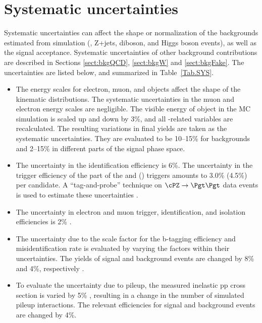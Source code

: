 \section{Systematic uncertainties}
\label{sect:sys}
Systematic uncertainties can affect the shape or normalization of the
backgrounds estimated from simulation (\ttbar, Z+jets, diboson, and Higgs boson events),
as well as the signal acceptance.
Systematic uncertainties of other background contributions are described in Sections \ref{sect:bkgQCD}, \ref{sect:bkgW} and \ref{sect:bkgFake}.
The uncertainties are listed below, and summarized in Table~\ref{Tab.SYS}.

\begin{itemize}
\item  The energy scales for electron, muon, and \Tau objects affect the shape of the kinematic distributions.
 The systematic uncertainties in the muon and electron energy scales are negligible.
The visible energy of \Tau object in the MC simulation is scaled up and down
by 3\%, and all \Tau-related variables are recalculated. The resulting variations in
final yields are taken as the systematic uncertainties. They are evaluated to be 10--15\% for
backgrounds and 2--15\% in different parts of the signal phase space.

\item The uncertainty in the \Tau identification efficiency is 6\%. The uncertainty in the trigger
efficiency of the \Tau part of the \eTau and \muTau (\tauTau) triggers amounts to 3.0\% (4.5\%) per
\Tau candidate. A ``tag-and-probe'' technique \cite{Chatrchyan:2014mua} on $\cPZ\to \Pgt\Pgt$ data
events is used to estimate these uncertainties \cite{Khachatryan:2014wca}.

\item The uncertainty in electron and muon trigger, identification, and
isolation efficiencies is 2\% \cite{Khachatryan:2014wca}.

\item The uncertainty due to the scale factor for the b-tagging efficiency and misidentification
rate is evaluated by varying the factors within their uncertainties. The yields of signal and background events are changed by 8\%
and 4\%, respectively \cite{Chatrchyan:2012jua}.

\item To evaluate the uncertainty due to pileup, the measured inelastic pp cross section is
  varied by 5\% \cite{Antchev:2011vs}, resulting in a change in the number of simulated pileup interactions.
 The relevant efficiencies for signal and background events are changed by 4\%.


\end{itemize}
